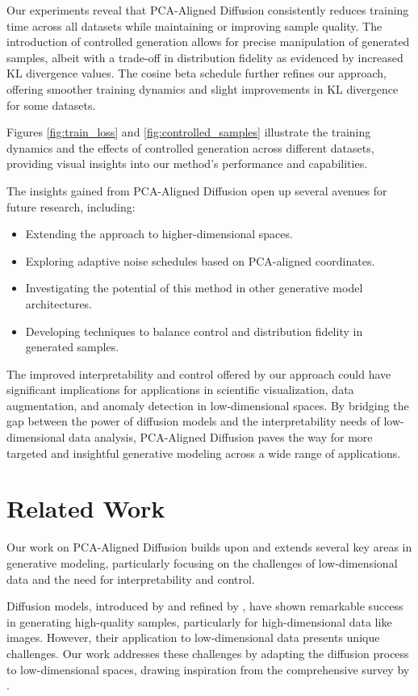 \documentclass{article} %
\begin{document}
Our experiments reveal that PCA-Aligned Diffusion consistently reduces training time across all datasets while maintaining or improving sample quality. The introduction of controlled generation allows for precise manipulation of generated samples, albeit with a trade-off in distribution fidelity as evidenced by increased KL divergence values. The cosine beta schedule further refines our approach, offering smoother training dynamics and slight improvements in KL divergence for some datasets.

Figures \ref{fig:train_loss} and \ref{fig:controlled_samples} illustrate the training dynamics and the effects of controlled generation across different datasets, providing visual insights into our method's performance and capabilities.

The insights gained from PCA-Aligned Diffusion open up several avenues for future research, including:
\begin{itemize}
    \item Extending the approach to higher-dimensional spaces.
    \item Exploring adaptive noise schedules based on PCA-aligned coordinates.
    \item Investigating the potential of this method in other generative model architectures.
    \item Developing techniques to balance control and distribution fidelity in generated samples.
\end{itemize}

The improved interpretability and control offered by our approach could have significant implications for applications in scientific visualization, data augmentation, and anomaly detection in low-dimensional spaces. By bridging the gap between the power of diffusion models and the interpretability needs of low-dimensional data analysis, PCA-Aligned Diffusion paves the way for more targeted and insightful generative modeling across a wide range of applications.

\section{Related Work}
\label{sec:related}

Our work on PCA-Aligned Diffusion builds upon and extends several key areas in generative modeling, particularly focusing on the challenges of low-dimensional data and the need for interpretability and control.

Diffusion models, introduced by \citet{pmlr-v37-sohl-dickstein15} and refined by \citet{ddpm}, have shown remarkable success in generating high-quality samples, particularly for high-dimensional data like images. However, their application to low-dimensional data presents unique challenges. Our work addresses these challenges by adapting the diffusion process to low-dimensional spaces, drawing inspiration from the comprehensive survey by \citet{yang2023diffusion}.
\end{document}
